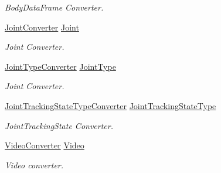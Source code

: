 \begin{DoxyCompactItemize}
\begin{DoxyCompactList}\small\item\em Body\+Data\+Frame Converter. \end{DoxyCompactList}\item 
\mbox{\hyperlink{class_bar_none_1_1_shared_1_1_data_converters_1_1_joint_converter}{Joint\+Converter}} \mbox{\hyperlink{class_bar_none_1_1_shared_1_1_data_converters_1_1_converters_aa987fdf655a8afe6abe131a36a49cc17}{Joint}}
\begin{DoxyCompactList}\small\item\em Joint Converter. \end{DoxyCompactList}\item 
\mbox{\hyperlink{class_bar_none_1_1_shared_1_1_data_converters_1_1_joint_type_converter}{Joint\+Type\+Converter}} \mbox{\hyperlink{class_bar_none_1_1_shared_1_1_data_converters_1_1_converters_a16649461dcca93cee07107512184f687}{Joint\+Type}}
\begin{DoxyCompactList}\small\item\em Joint Converter. \end{DoxyCompactList}\item 
\mbox{\hyperlink{class_bar_none_1_1_shared_1_1_data_converters_1_1_joint_tracking_state_type_converter}{Joint\+Tracking\+State\+Type\+Converter}} \mbox{\hyperlink{class_bar_none_1_1_shared_1_1_data_converters_1_1_converters_ad55eb167c18619d556ddd8f113ee8fb6}{Joint\+Tracking\+State\+Type}}
\begin{DoxyCompactList}\small\item\em Joint\+Tracking\+State Converter. \end{DoxyCompactList}\item 
\mbox{\hyperlink{class_bar_none_1_1_shared_1_1_data_converter_1_1_lift_1_1_video_converter}{Video\+Converter}} \mbox{\hyperlink{class_bar_none_1_1_shared_1_1_data_converters_1_1_converters_a1d18eff598959b2b968850cc30284014}{Video}}
\begin{DoxyCompactList}\small\item\em Video converter. \end{DoxyCompactList}\end{DoxyCompactItemize}
